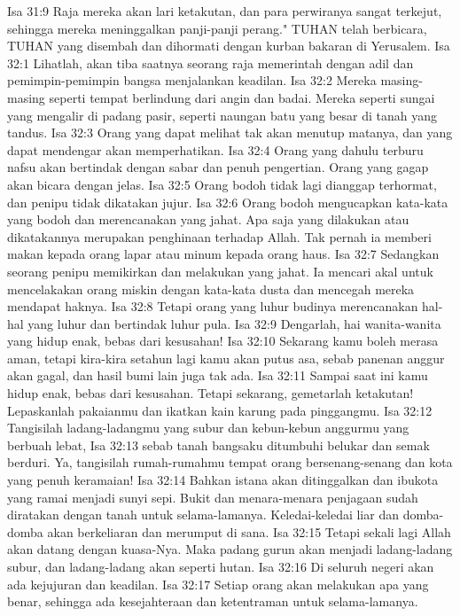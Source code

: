 Isa 31:9  Raja mereka akan lari ketakutan, dan para perwiranya sangat terkejut, sehingga mereka meninggalkan panji-panji perang." TUHAN telah berbicara, TUHAN yang disembah dan dihormati dengan kurban bakaran di Yerusalem.
Isa 32:1  Lihatlah, akan tiba saatnya seorang raja memerintah dengan adil dan pemimpin-pemimpin bangsa menjalankan keadilan.
Isa 32:2  Mereka masing-masing seperti tempat berlindung dari angin dan badai. Mereka seperti sungai yang mengalir di padang pasir, seperti naungan batu yang besar di tanah yang tandus.
Isa 32:3  Orang yang dapat melihat tak akan menutup matanya, dan yang dapat mendengar akan memperhatikan.
Isa 32:4  Orang yang dahulu terburu nafsu akan bertindak dengan sabar dan penuh pengertian. Orang yang gagap akan bicara dengan jelas.
Isa 32:5  Orang bodoh tidak lagi dianggap terhormat, dan penipu tidak dikatakan jujur.
Isa 32:6  Orang bodoh mengucapkan kata-kata yang bodoh dan merencanakan yang jahat. Apa saja yang dilakukan atau dikatakannya merupakan penghinaan terhadap Allah. Tak pernah ia memberi makan kepada orang lapar atau minum kepada orang haus.
Isa 32:7  Sedangkan seorang penipu memikirkan dan melakukan yang jahat. Ia mencari akal untuk mencelakakan orang miskin dengan kata-kata dusta dan mencegah mereka mendapat haknya.
Isa 32:8  Tetapi orang yang luhur budinya merencanakan hal-hal yang luhur dan bertindak luhur pula.
Isa 32:9  Dengarlah, hai wanita-wanita yang hidup enak, bebas dari kesusahan!
Isa 32:10  Sekarang kamu boleh merasa aman, tetapi kira-kira setahun lagi kamu akan putus asa, sebab panenan anggur akan gagal, dan hasil bumi lain juga tak ada.
Isa 32:11  Sampai saat ini kamu hidup enak, bebas dari kesusahan. Tetapi sekarang, gemetarlah ketakutan! Lepaskanlah pakaianmu dan ikatkan kain karung pada pinggangmu.
Isa 32:12  Tangisilah ladang-ladangmu yang subur dan kebun-kebun anggurmu yang berbuah lebat,
Isa 32:13  sebab tanah bangsaku ditumbuhi belukar dan semak berduri. Ya, tangisilah rumah-rumahmu tempat orang bersenang-senang dan kota yang penuh keramaian!
Isa 32:14  Bahkan istana akan ditinggalkan dan ibukota yang ramai menjadi sunyi sepi. Bukit dan menara-menara penjagaan sudah diratakan dengan tanah untuk selama-lamanya. Keledai-keledai liar dan domba-domba akan berkeliaran dan merumput di sana.
Isa 32:15  Tetapi sekali lagi Allah akan datang dengan kuasa-Nya. Maka padang gurun akan menjadi ladang-ladang subur, dan ladang-ladang akan seperti hutan.
Isa 32:16  Di seluruh negeri akan ada kejujuran dan keadilan.
Isa 32:17  Setiap orang akan melakukan apa yang benar, sehingga ada kesejahteraan dan ketentraman untuk selama-lamanya.
